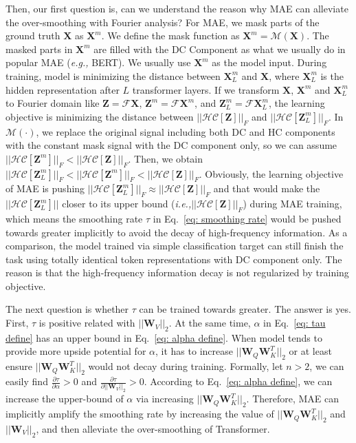 \documentclass{article}
\theoremstyle{plain}
\theoremstyle{definition}
\theoremstyle{remark}
\newcommand{\ie}{\emph{i.e.,}\xspace}
\newcommand{\eg}{\emph{e.g.,}\xspace}
\begin{document}
Then, our first question is, can we understand the reason why MAE can alleviate the over-smoothing with Fourier analysis? For MAE, we mask parts of the ground truth $\mathbf{X}$ as $\mathbf{X}^m$. We define the mask function as $\mathbf{X}^m=\mathcal{M}(\mathbf{X})$. The masked parts in $\mathbf{X}^m$ are filled with the DC Component as what we usually do in popular MAE (\eg BERT). We usually use $\mathbf{X}^m$ as the model input. During training, model is minimizing the distance between $\mathbf{X}^m_L$ and $\mathbf{X}$, where $\mathbf{X}^m_L$ is the hidden representation after $L$ transformer layers. If we transform $\mathbf{X}$, $\mathbf{X}^m$ and $\mathbf{X}^m_L$ to Fourier domain like $\mathbf{Z}=\mathcal{F}\mathbf{X}$, $\mathbf{Z}^m=\mathcal{F}\mathbf{X}^m$, and $\mathbf{Z}^m_L=\mathcal{F}\mathbf{X}^m_L$, the learning objective is minimizing the distance between $||\mathcal{HC}[\mathbf{Z}]||_F$ and $||\mathcal{HC}[\mathbf{Z}^m_L]||_F$. In $\mathcal{M}(\cdot)$, we replace the original signal including both DC and HC components with the constant mask signal with the DC component only, so we can assume $||\mathcal{HC}[\mathbf{Z}^m]||_F<||\mathcal{HC}[\mathbf{Z}]||_F$. Then, we obtain $||\mathcal{HC}[\mathbf{Z}^m_L]||_F<||\mathcal{HC}[\mathbf{Z}^m]||_F<||\mathcal{HC}[\mathbf{Z}]||_F$. Obviously, the learning objective of MAE is pushing $||\mathcal{HC}[\mathbf{Z}^m_L]||_F\approx||\mathcal{HC}[\mathbf{Z}]||_F$ and that would make the $||\mathcal{HC}[\mathbf{Z}^m_L]||$ closer to its upper bound (\ie $||\mathcal{HC}[\mathbf{Z}]||_F$) during MAE training, which means the smoothing rate $\tau$ in Eq.~\ref{eq: smoothing rate} would be pushed towards greater implicitly to avoid the decay of high-frequency information. As a comparison, the model trained via simple classification target can still finish the task using totally identical token representations with DC component only. The reason is that the high-frequency information decay is not regularized by training objective.

The next question is whether $\tau$ can be trained towards greater. The answer is yes. First, $\tau$ is positive related with $||\mathbf{W}_V||_2$. At the same time, $\alpha$ in Eq.~\ref{eq: tau define} has an upper bound in Eq.~\ref{eq: alpha define}.
When model tends to provide more upside potential for $\alpha$, it has to increase $||\mathbf{W}_Q \mathbf{W}_K^T||_2$ or at least ensure $||\mathbf{W}_Q \mathbf{W}_K^T||_2$ would not decay during training.
Formally, let $n>2$, we can easily find $\frac{\partial\tau}{\partial \alpha}>0$ and $\frac{\partial\tau}{\partial ||\mathbf{W}_V||_2}>0$. According to Eq.~\ref{eq: alpha define}, we can increase the upper-bound of $\alpha$ via increasing $||\mathbf{W}_Q \mathbf{W}_K^T||_2$. Therefore, MAE can implicitly amplify the smoothing rate by increasing the value of $||\mathbf{W}_Q \mathbf{W}_K^T||_2$ and $||\mathbf{W}_V||_2$, and then alleviate the over-smoothing of Transformer.
\end{document}
